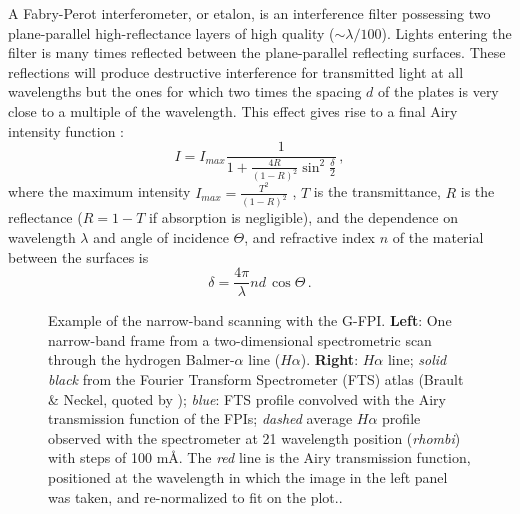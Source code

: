 A Fabry-Perot interferometer, or etalon, is an interference filter possessing two plane-parallel  high-reflectance layers of high quality ($ \sim\lambda/100$). Lights entering the filter is many times reflected between the plane-parallel reflecting surfaces. These reflections will produce  destructive interference for transmitted light at all wavelengths but the ones for which two times the spacing $d$ of the plates is very close to a multiple of the wavelength. This effect gives rise to a final Airy intensity function \citep{Born:1999lr}:
\begin{equation}
I=I_{max}\frac{1}{1+\frac{4R}{(1-R)^{2}}\sin^{2}\frac{\delta}{2}} \, ,
\end{equation}
where  the maximum intensity $I_{max}=\frac{T^{2}}{(1-R)^{2}}$ , $T$ is the transmittance, $R$ is the reflectance ($R=1-T$ if absorption is negligible), and the dependence on wavelength $\lambda$ and angle of incidence $\Theta$, and refractive index $n$ of the material between the surfaces is
\begin{equation}
\label{eq:fpid}
\delta=\frac{4\pi}{\lambda}nd\,\cos\Theta \, .
\end{equation}


\begin{figure}[t]
\centering
  \quad%
\caption{Example of the narrow-band scanning with the G-FPI. {\bf Left}: One narrow-band frame from a two-dimensional spectrometric scan through the hydrogen Balmer-$\alpha$ line ($H\alpha$).{ \bf Right}: $H\alpha$ line; \emph{solid black} from the Fourier Transform Spectrometer (FTS) atlas  (Brault \& Neckel, quoted by \citealt{Neckel:1999lr}); \emph{blue}: FTS profile convolved with the Airy transmission function of the FPIs; \emph{dashed} average $H\alpha$ profile observed with the spectrometer at 21 wavelength position (\emph{rhombi}) with steps of 100 m\AA. The \emph{red} line is the Airy transmission function, positioned at the wavelength in which the image in the left panel was taken, and re-normalized to fit on the plot..}
\label{fpi:scan}
\end{figure}


